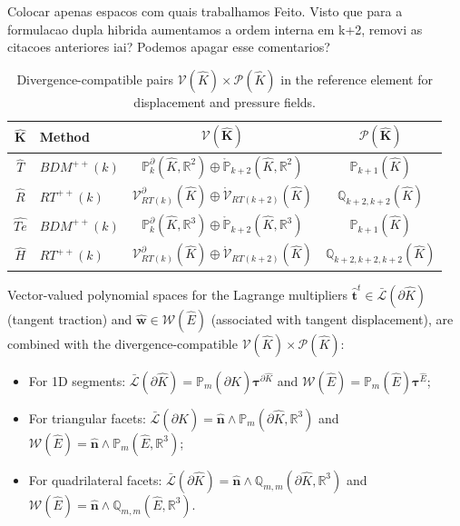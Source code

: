 \documentclass[english,11pt,3p,number,sort&compress]{elsarticle}
\newcommand{\giovane}{\color{red}{\bf\Large GA} \color{cyan} }
\newcommand{\nathan}{\color{red}{\bf\Large NS} \color{cyan} }
\newcommand{\phil}{\color{yellow}{\bf\Large PD} \color{cyan} }
\begin{document}
{\phil Colocar apenas espacos com quais trabalhamos} {\giovane Feito. Visto que para a formulacao dupla hibrida aumentamos a ordem interna em k+2, removi as citacoes anteriores} {\nathan iai? Podemos apagar esse comentarios?}
\begin{table}[h]
    \centering
    \renewcommand{\arraystretch}{1.5}
    \begin{tabular}{c l c c}
        \toprule
        $\bm{\hat{K}}$ & \textbf{Method} & $\bm{\mathcal{V}(\hat{K})}$ & $\bm{\mathcal{P}(\hat{K})}$ \\
        \midrule
        \multirow{1}{*}{$\hat{T}$} 
        & $BDM^{++}(k)$ & $\mathbb{P}_k^{\partial}(\hat{K}, \mathbb{R}^2) \oplus \mathring{\mathbb{P}}_{k+2}(\hat{K}, \mathbb{R}^2)$ & $\mathbb{P}_{k+1}(\hat{K})$ \\
        \midrule
        \multirow{1}{*}{$\hat{R}$} 
        & $RT^{++}(k)$ & $\mathcal{V}_{RT(k)}^\partial(\hat{K}) \oplus \mathring{\mathcal{V}}_{RT(k+2)}(\hat{K})$ & $\mathbb{Q}_{k+2,k+2}(\hat{K})$ \\
        \midrule
        \multirow{1}{*}{$\hat{Te}$}
        & $BDM^{++}(k)$ & $\mathbb{P}_k^\partial(\hat{K}, \mathbb{R}^3) \oplus \mathring{\mathbb{P}}_{k+2}(\hat{K}, \mathbb{R}^3)$ & $\mathbb{P}_{k+1}(\hat{K})$ \\
        \midrule
        \multirow{1}{*}{$\hat{H}$} 
        & $RT^{++}(k)$ & $\mathcal{V}_{RT(k)}^\partial(\hat{K}) \oplus \mathring{\mathcal{V}}_{RT(k+2)}(\hat{K})$ & $\mathbb{Q}_{k+2,k+2,k+2}(\hat{K})$ \\
        \bottomrule
    \end{tabular}
    \caption{Divergence-compatible pairs $\mathcal{V}(\hat{K}) \times \mathcal{P}(\hat{K})$ in the reference element for displacement and pressure fields.}
    \label{tab:FE_pairs}
\end{table}

Vector-valued polynomial spaces for the Lagrange multipliers $\bm{\hat{t}}^t \in \bar{\mathcal{L}}(\partial \hat{K})$ (tangent traction) and $\bm{\hat{w}} \in \mathcal{W}(\hat{E})$ (associated with tangent displacement), are combined with the divergence-compatible $\mathcal{V}(\hat{K})\times\mathcal{P}(\hat{K})$:
\begin{itemize}
	\item For 1D segments: $\bar{\mathcal{L}}(\partial \hat{K})=\mathbb{P}_m(\partial \hat{K})\bm{\tau}^{\partial\hat{K}}$ and $\mathcal{W}(\hat{E})=\mathbb{P}_m(\hat{E})\bm{\tau}^{\hat{E}}$;
	\item For triangular facets: $\bar{\mathcal{L}}(\partial \hat{K})=\bm{\hat{n}} \wedge \mathbb{P}_m(\partial \hat{K},\mathbb{R}^3)$ and $\mathcal{W}(\hat{E})=\bm{\hat{n}} \wedge \mathbb{P}_m(\hat{E},\mathbb{R}^3)$;
	\item For quadrilateral facets: $\bar{\mathcal{L}}(\partial \hat{K})=\bm{\hat{n}} \wedge \mathbb{Q}_{m,m}(\partial \hat{K},\mathbb{R}^3)$ and $\mathcal{W}(\hat{E})=\bm{\hat{n}} \wedge \mathbb{Q}_{m,m}(\hat{E},\mathbb{R}^3)$.
\end{itemize}
\end{document}
